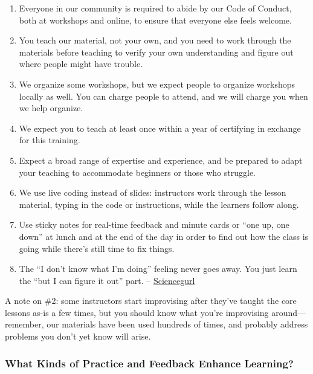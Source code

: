 \begin{enumerate}
\def\labelenumi{\arabic{enumi}.}
\itemsep1pt\parskip0pt
\item
  Everyone in our community is required to abide by our
  Code of Conduct, both
  at workshops and online, to ensure that everyone else feels welcome.
\item
  You teach our material, not your own, and you need to work through the
  materials before teaching to verify your own understanding and figure
  out where people might have trouble.
\item
  We organize some workshops, but we expect people to organize workshops
  locally as well. You can charge people to attend, and we will charge
  you when we help organize.
\item
  We expect you to teach at least once within a year of certifying in
  exchange for this training.
\item
  Expect a broad range of expertise and experience, and be prepared to
  adapt your teaching to accommodate beginners or those who struggle.
\item
  We use live coding instead of slides: instructors work through the
  lesson material, typing in the code or instructions, while the
  learners follow along.
\item
  Use sticky notes for real-time feedback and minute cards or ``one up,
  one down'' at lunch and at the end of the day in order to find out how
  the class is going while there's still time to fix things.
\item
  The ``I don't know what I'm doing'' feeling never goes away. You just
  learn the ``but I can figure it out'' part. --
  \href{https://twitter.com/sciencegurlz0/status/687739023826235393}{Sciencegurl}
\end{enumerate}

A note on \#2: some instructors start improvising after they've taught
the core lessons as-is a few times, but you should know what you're
improvising around---remember, our materials have been used hundreds of
times, and probably address problems you don't yet know will arise.

\subsubsection{What Kinds of Practice and Feedback Enhance
Learning?}\label{what-kinds-of-practice-and-feedback-enhance-learning}

